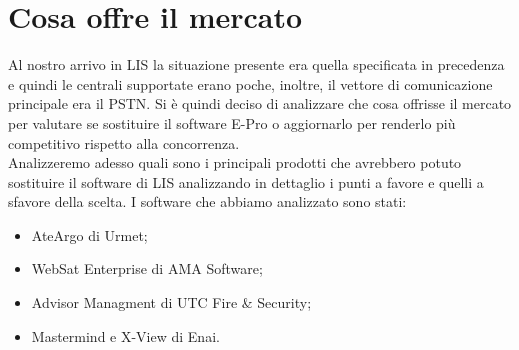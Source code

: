 \section{Cosa offre il mercato}
Al nostro arrivo in LIS la situazione presente era quella specificata in precedenza e quindi le centrali supportate erano poche, inoltre, il vettore di comunicazione principale era il PSTN. Si è quindi deciso di analizzare che cosa offrisse il mercato per valutare se sostituire il software E-Pro o aggiornarlo per renderlo più competitivo rispetto alla concorrenza.\\
Analizzeremo adesso quali sono i principali prodotti che avrebbero potuto sostituire il software di LIS analizzando in dettaglio i punti a favore e quelli a sfavore della scelta.
I software che abbiamo analizzato sono stati:
\begin{itemize}
	\item AteArgo di Urmet;
	\item WebSat Enterprise di AMA Software;
	\item Advisor Managment di UTC Fire \& Security;
	\item Mastermind e X-View di Enai.
\end{itemize}
